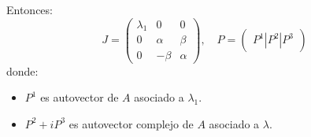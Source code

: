 \begin{enumerate}
          Entonces:
          $$J = \begin{pmatrix}
                  \lambda_1 & 0      & 0      \\
                  0         & \alpha & \beta  \\
                  0         & -\beta & \alpha
              \end{pmatrix}, \quad
              P = \begin{pmatrix}
                  P^1 | P^2 | P^3
              \end{pmatrix}$$
          donde:
          \begin{itemize}
              \item $P^1$ es autovector de $A$ asociado a $\lambda_1$.
              \item $P^2 + iP^3$ es autovector complejo de $A$ asociado a $\lambda$.
          \end{itemize}
\end{enumerate}